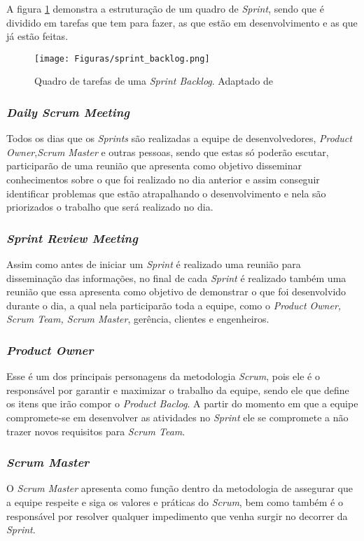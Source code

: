 A figura \ref{chave_para_refencia_cruzada} demonstra a estruturação de um quadro de \textit{Sprint}, sendo que é dividido em tarefas que tem para fazer, as que estão em desenvolvimento e as que já estão feitas.

\begin{figure}[!htb]
  \centering 
  \texttt{[image: Figuras/sprint\_backlog.png]}
  \caption{Quadro de tarefas de uma \textit{Sprint Backlog}. Adaptado de \cite{0000:rafael}}
  \label{chave_para_refencia_cruzada}
\end{figure}

\subsubsection{\textit{Daily Scrum Meeting}}
\noindent Todos os dias que os \textit{Sprints} são realizadas a equipe de desenvolvedores, \textit{Product  Owner},\textit{Scrum Master} e outras pessoas, sendo que estas só poderão escutar, participarão de uma reunião que apresenta como objetivo disseminar conhecimentos sobre o que foi realizado no dia anterior e assim conseguir identificar problemas que estão atrapalhando o desenvolvimento e nela são priorizados o trabalho que será realizado no dia.

\subsubsection{\textit{Sprint Review Meeting}}
\noindent Assim como antes de iniciar um \textit{Sprint} é realizado uma reunião para disseminação das informações, no final de cada \textit{Sprint} é realizado também uma reunião que essa apresenta como objetivo de demonstrar o que foi desenvolvido durante o dia, a qual nela participarão toda a equipe, como o \textit{Product Owner, Scrum Team, Scrum Master}, gerência, clientes e engenheiros.

\subsubsection{\textit{Product Owner}}
\noindent Esse é um dos principais personagens da metodologia \textit{Scrum}, pois ele é o responsável por garantir e maximizar o trabalho da equipe, sendo ele que define os itens que irão compor o \textit{Product Baclog}. A partir do momento em que a equipe compromete-se em desenvolver as atividades no \textit{Sprint} ele se compromete a não trazer novos requisitos para \textit{Scrum Team}.

\subsubsection{\textit{Scrum Master}}
\noindent O \textit{Scrum Master} apresenta como função dentro da metodologia de assegurar que a equipe respeite e siga os valores e práticas do \textit{Scrum}, bem como também é o responsável por resolver qualquer impedimento que venha surgir no decorrer da \textit{Sprint}.

